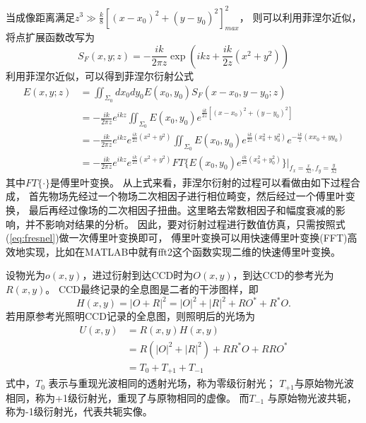 \documentclass[11pt,a4paper]{article}
\begin{document}
当成像距离满足$z^3\gg\frac{k}{8}[(x-x_0)^2+(y-y_0)^2]_{max}^2$，
则可以利用菲涅尔近似，将点扩展函数改写为
\begin{equation}
S_F(x, y; z) =  - \frac{i k}{2 \pi z} \exp(i k z + \frac{i k}{ 2 z} (x^2+y^2))
\end{equation}
利用菲涅尔近似，可以得到菲涅尔衍射公式
\begin{equation}
\begin{split}
E(x, y; z) &=  \iint_{\Sigma_0}dx_0dy_0 E(x_0,y_0) S_F(x-x_0, y-y_0; z) \\
			&= -\frac{i k}{2 \pi z} e^{i k z} \iint_{\Sigma_0} E(x_0,y_0) e^{ \frac{i k}{ 2 z} [(x-x_0)^2+(y-y_0)^2] } \\
			&= -\frac{i k}{2 \pi z} e^{i k z} e^{\frac{i k }{2 z} (x^2+y^2)} \iint_{\Sigma_0} E(x_0,y_0) e^{ \frac{i k}{ 2 z} (x_0^2+y_0^2)} e^{- \frac{i k}{ z} (x x_0+y y_0)} \\
			&= -\frac{i k}{2 \pi z} e^{i k z} e^{\frac{i k }{2 z} (x^2+y^2)} FT\{E(x_0,y_0) e^{ \frac{i k}{ 2 z} (x_0^2+y_0^2)}\} \vert_{f_x = \frac{x}{\lambda z}, f_y = \frac{y}{\lambda z}}
\end{split}
\label{eq:fresnel}
\end{equation}
其中$FT\{\cdot\}$是傅里叶变换。
从上式来看，菲涅尔衍射的过程可以看做由如下过程合成，
首先物场先经过一个物场二次相因子进行相位畸变，然后经过一个傅里叶变换，
最后再经过像场的二次相因子扭曲。这里略去常数相因子和幅度衰减的影响，并不影响对结果的分析。
因此，要对衍射过程进行数值仿真，只需按照式(\ref{eq:fresnel})做一次傅里叶变换即可，
傅里叶变换可以用快速傅里叶变换(FFT)高效地实现，比如在MATLAB中就有fft2这个函数实现二维的快速傅里叶变换。

设物光为$o(x, y)$，进过衍射到达CCD时为$O(x,y)$，到达CCD的参考光为$R(x,y)$。
CCD最终记录的全息图是二者的干涉图样，即
\begin{equation}
H(x,y) = |O+R|^2 = |O|^2 + |R|^2 +RO^*+R^*O.
\end{equation}
若用原参考光照明CCD记录的全息图，则照明后的光场为
\begin{equation}
\begin{split}
U(x,y) &= R(x,y)H(x,y) \\
		&= R(|O|^2 + |R|^2) + RR^*O + RRO^* \\
		&= T_0 + T_{+1} + T_{-1}
\end{split}		
\end{equation}
式中，$T_0$ 表示与重现光波相同的透射光场，称为零级衍射光；
$T_{+1}$与原始物光波相同，称为+1级衍射光，重现了与原物相同的虚像。
而$T_{-1}$	与原始物光波共轭，称为-1级衍射光，代表共轭实像。
\end{document}

